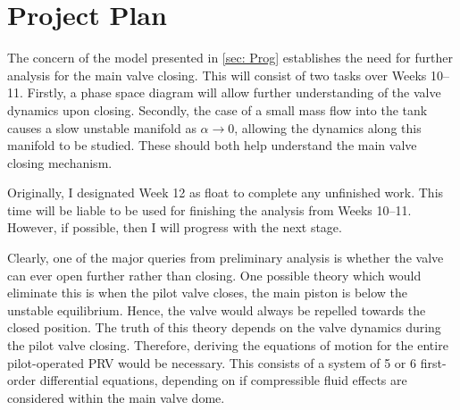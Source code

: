 \section{Project Plan}


The concern of the model presented in \cref{sec: Prog} establishes  the need for further analysis for the main valve closing. This will consist of two tasks over Weeks 10--11. Firstly, a phase space diagram will allow further understanding of the valve dynamics upon closing. Secondly, the case of a small mass flow into the tank causes a slow unstable manifold as $\alpha \rightarrow 0$, allowing the dynamics along this manifold to be studied. These should both help understand the main valve closing mechanism.

Originally, I designated Week 12 as float to complete any unfinished work. This time will be liable to be used for finishing the analysis from Weeks 10--11. However, if possible, then I will progress with the next stage.


Clearly, one of the major queries from preliminary analysis is whether the valve can ever open further rather than closing. One possible theory which would eliminate this is when the pilot valve closes, the main piston is below the unstable equilibrium. Hence, the valve would always be repelled towards the closed position. The truth of this theory depends on the valve dynamics during the pilot valve closing. Therefore, deriving the equations of motion for the entire pilot-operated PRV would be necessary. This consists of a system of 5 or 6 first-order differential equations, depending on if compressible fluid effects are considered within the main valve dome.

